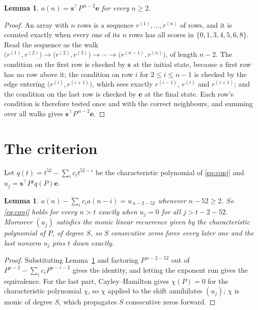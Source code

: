\documentclass[11pt,a4paper]{article}
\theoremstyle{plain}
\newtheorem{lemma}[theorem]{Lemma}
\theoremstyle{definition}
\begin{document}
\begin{lemma}\label{lem:walk}
$a(n)=\mathbf{s}^{\!\top}P^{\,n-2}\mathbf{e}$ for every $n\ge2$.
\end{lemma}

\begin{proof}
An array with $n$ rows is a sequence $r^{(1)},\dots,r^{(n)}$ of rows, and it is counted
exactly when every one of its $n$ rows has all scores in $\{0,1,3,4,5,6,8\}$. Read the sequence as the
walk $\bigl(r^{(1)},r^{(2)}\bigr)\to\bigl(r^{(2)},r^{(3)}\bigr)\to\cdots\to
\bigl(r^{(n-1)},r^{(n)}\bigr)$, of length $n-2$. The condition on the first row is
checked by $\mathbf{s}$ at the initial state, because a first row has no row above it; the
condition on row $i$ for $2\le i\le n-1$ is checked by the edge entering
$\bigl(r^{(i)},r^{(i+1)}\bigr)$, which sees exactly $r^{(i-1)}$, $r^{(i)}$ and
$r^{(i+1)}$; and the condition on the last row is checked by $\mathbf{e}$ at the final
state. Each row's condition is therefore tested once and with the correct neighbours, and
summing over all walks gives $\mathbf{s}^{\!\top}P^{\,n-2}\mathbf{e}$.
\end{proof}

\section{The criterion}

Let $q(t)=t^{52}-\sum_i c_i t^{52-i}$ be the characteristic polynomial of
\eqref{eq:conj} and $u_j=\mathbf{s}^{\!\top}P^{j}q(P)\mathbf{e}$.

\begin{lemma}\label{lem:crit}
$a(n)-\sum_i c_i a(n-i)=u_{\,n-2-52}$ whenever $n-52\ge2$. So \eqref{eq:conj}
holds for every $n>t$ exactly when $u_j=0$ for all $j>t-2-52$. Moreover $(u_j)$
satisfies the monic linear recurrence given by the characteristic polynomial of $P$, of
degree $S$, so $S$ consecutive zeros force every later one and the last nonzero $u_j$ pins
$t$ down exactly.
\end{lemma}

\begin{proof}
Substituting Lemma~\ref{lem:walk} and factoring $P^{\,n-2-52}$ out of
$P^{n-2}-\sum_i c_i P^{n-i-2}$ gives the identity, and letting the exponent run gives the
equivalence. For the last part, Cayley--Hamilton gives $\chi(P)=0$ for the characteristic
polynomial $\chi$, so $\chi$ applied to the shift annihilates $(u_j)$; $\chi$ is monic of
degree $S$, which propagates $S$ consecutive zeros forward.
\end{proof}
\end{document}
